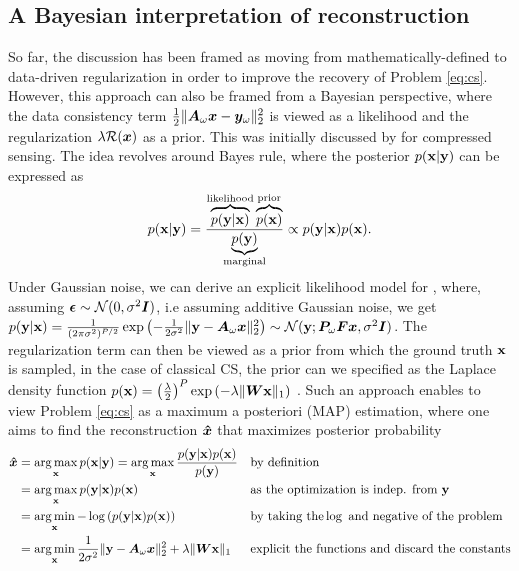 \subsection{A Bayesian interpretation of reconstruction}\label{ss:bayesian_recon}
So far, the discussion has been framed as moving from mathematically-defined to data-driven regularization in order to improve the recovery of Problem \ref{eq:cs}. However, this approach can also be framed from a Bayesian perspective, where the data consistency term $ \frac{1}{2}\|{\bm{A}}_\omega {\bm{x}} - {\bm{y}}_\omega\|_2^2$ is viewed as a likelihood and the regularization $ \lambda \mathcal{R}({\bm{x}})$ as a prior. This was initially discussed by \citet{ji2008bayesian} for compressed sensing. The idea revolves around Bayes rule, where the posterior $p({\mathbf{x}}|{\mathbf{y}})$ can be expressed as
\begin{equation}
    p({\mathbf{x}}|{\mathbf{y}}) = \frac{\overbrace{p({\mathbf{y}}|{\mathbf{x}})}^{\text{likelihood}}\overbrace{p({\mathbf{x}})}^{\text{prior}}}{\underbrace{p({\mathbf{y}})}_{\text{marginal}}} \propto p({\mathbf{y}}|{\mathbf{x}}) p({\mathbf{x}}).\label{eq:bayes}
\end{equation}
Under Gaussian noise, we can derive an explicit likelihood model for , where, assuming $\boldsymbol{\epsilon} \sim \mathcal{N}(0,\sigma^2{\bm{I}})$, i.e assuming additive Gaussian noise, we get $p({\mathbf{y}}|{\mathbf{x}}) = \frac{1}{(2\pi\sigma^2)^{P/2}}\exp\left(-\frac{1}{2\sigma^2}\|{\mathbf{y}} - {\bm{A}}_\omega {\bm{x}}\|_2^2\right) \sim \mathcal{N}({\mathbf{y}};{\bm{P}}_\omega {\bm{F}} {\bm{x}},\sigma^2{\bm{I}})$. The regularization term can then be viewed as a prior from which the ground truth ${\mathbf{x}}$ is sampled, in the case of classical CS, the prior can we specified as the Laplace density function $p({\mathbf{x}}) = \left(\frac{\lambda}{2}\right)^P \exp\left(-\lambda\|{\bm{W}}{\mathbf{x}}\|_1\right)$ \citep{ji2008bayesian}. Such an approach enables to view Problem \ref{eq:cs} as a maximum a posteriori (MAP) estimation, where one aims to find the reconstruction $\bm{\hat{x}}$ that maximizes posterior probability
\begin{align*}
    \bm{\hat{x}} &= \operatorname*{arg\,max}_{\mathbf{x}} p({\mathbf{x}}|{\mathbf{y}}) = \operatorname*{arg\,max}_{\mathbf{x}} \frac{p({\mathbf{y}}|{\mathbf{x}}) p({\mathbf{x}})}{p({\mathbf{y}})} && \text{by definition}\\
        &=  \operatorname*{arg\,max}_{\mathbf{x}} p({\mathbf{y}}|{\mathbf{x}}) p({\mathbf{x}}) && \text{as the optimization is indep. from } {\mathbf{y}}\\
        &= \operatorname*{arg\,min}_{\mathbf{x}} -\log\left(p({\mathbf{y}}|{\mathbf{x}}) p({\mathbf{x}})\right)  && \text{by taking the} \log \text{ and negative of the problem}\\
        &= \operatorname*{arg\,min}_{\mathbf{x}} \frac{1}{2\sigma^2}\|{\mathbf{y}} - {\bm{A}}_\omega {\bm{x}}\|_2^2 +  \lambda\|{\bm{W}}{\mathbf{x}}\|_1 && \text{explicit the functions and discard the constants}\\
\end{align*}

